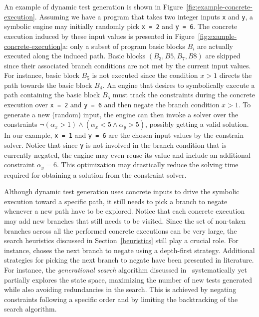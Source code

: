 An example of dynamic test generation is shown in Figure~\ref{fig:example-concrete-execution}. Assuming we have a program that takes two integer inputs {\tt x} and {\tt y}, a symbolic engine may initially randomly pick {\tt x = 2} and {\tt y = 6}. The concrete execution induced by these input values is presented in Figure~\ref{fig:example-concrete-execution}a: only a subset of program basic blocks $B_i$ are actually executed along the induced path. Basic blocks $(B_3, B5, B_7, B8)$  are skipped since their associated branch conditions are not met by the current input values. For instance, basic block $B_5$ is not executed since the condition $x > 1$ directs the path towards the basic block $B_4$. An engine that desires to symbolically execute a path containing the basic block $B_5$ must track the constraints during the concrete execution over {\tt x = 2} and {\tt y = 6} and then negate the branch condition $x > 1$. To generate a new (random) input, the engine can then invoke a solver over the constraints $\neg(\alpha_x > 1) \wedge (\alpha_x  < 5 \wedge \alpha_y > 5)$, possibly getting a valid solution. In our example, {\tt x = 1} and {\tt y = 6} are the chosen input values by the constrain solver. Notice that since {\tt y} is not involved in the branch condition that is currently negated, the engine may even reuse its value and include an additional constraint $\alpha_y = 6$. This optimization may drastically reduce the solving time required for obtaining a solution from the constraint solver.

Although dynamic test generation uses concrete inputs to drive the symbolic execution toward a specific path, it still needs to pick a branch to negate whenever a new path have to be explored. Notice that each concrete execution may add new branches that still needs to be visited. Since the set of non-taken branches across all the performed concrete executions can be very large, the search heuristics discussed in Section~\ref{heuristics} still play a crucial role. For instance, \cite{DART-PLDI05} choses the next branch to negate using a depth-first strategy. Additional strategies for picking the next branch to negate have been presented in literature. For instance, the {\em generational search} algorithm discussed in~\cite{SAGE-NDSS08} systematically yet partially explores the state space, maximizing the number of new tests generated while also avoiding redundancies in the search. This is achieved by negating constraints following a specific order and by limiting the backtracking of the search algorithm.

